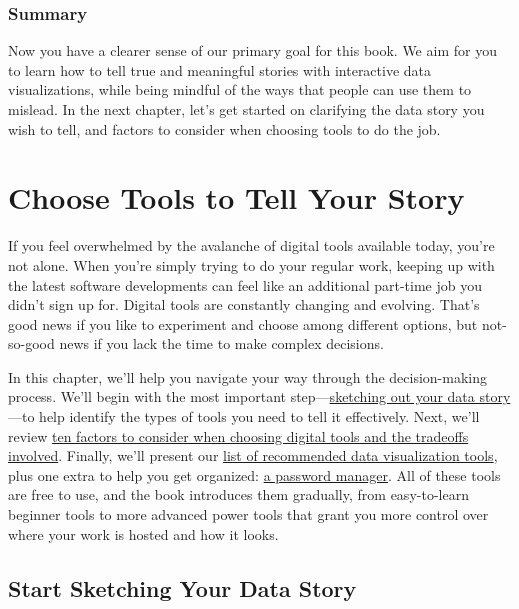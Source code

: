 \documentclass[
  english,
]{book}
\begin{document}
\hypertarget{summary0}{%
\subsection*{Summary}\label{summary0}}

Now you have a clearer sense of our primary goal for this book. We aim for you to learn how to tell true and meaningful stories with interactive data visualizations, while being mindful of the ways that people can use them to mislead. In the next chapter, let's get started on clarifying the data story you wish to tell, and factors to consider when choosing tools to do the job.

\hypertarget{choose}{%
\chapter{Choose Tools to Tell Your Story}\label{choose}}

If you feel overwhelmed by the avalanche of digital tools available today, you're not alone. When you're simply trying to do your regular work, keeping up with the latest software developments can feel like an additional part-time job you didn't sign up for. Digital tools are constantly changing and evolving. That's good news if you like to experiment and choose among different options, but not-so-good news if you lack the time to make complex decisions.

In this chapter, we'll help you navigate your way through the decision-making process. We'll begin with the most important step---\href{sketch.html}{sketching out your data story}---to help identify the types of tools you need to tell it effectively. Next, we'll review \href{tool-factors.html}{ten factors to consider when choosing digital tools and the tradeoffs involved}. Finally, we'll present our \href{recommended-tools.html}{list of recommended data visualization tools}, plus one extra to help you get organized: \href{password-manager.html}{a password manager}. All of these tools are free to use, and the book introduces them gradually, from easy-to-learn beginner tools to more advanced power tools that grant you more control over where your work is hosted and how it looks.

\hypertarget{sketch}{%
\section*{Start Sketching Your Data Story}\label{sketch}}
\end{document}
